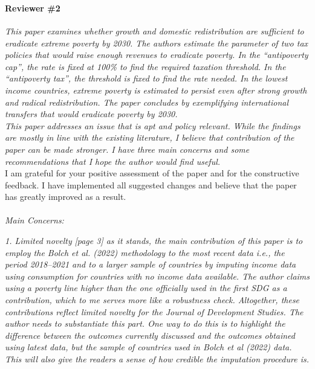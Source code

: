 \documentclass[12pt,english]{article}
\begin{document}
~\\ ~\\


\paragraph*{Reviewer \#2}

\textit{This paper examines whether growth and domestic redistribution are sufficient to eradicate extreme poverty by 2030. The authors estimate the parameter of two tax policies that would raise enough revenues to eradicate poverty. In the “antipoverty cap”, the rate is fixed at 100\% to find the required taxation threshold. In the “antipoverty tax”, the threshold is fixed to find the rate needed. In the lowest income countries, extreme poverty is estimated to persist even after strong growth and radical redistribution. The paper concludes by exemplifying international transfers that would eradicate poverty by 2030. }~\\

\textit{This paper addresses an issue that is apt and policy relevant. While the findings are mostly in line with the existing literature, I believe that contribution of the paper can be made stronger. I have three main concerns and some recommendations that I hope the author would find useful. }~\\

I am grateful for your positive assessment of the paper and for the constructive feedback. I have implemented all suggested changes and believe that the paper has greatly improved as a result.
~\\ ~\\
 
\textit{Main Concerns:}

\textit{1.	Limited novelty}
\textit{[page 3] as it stands, the main contribution of this paper is to employ the Bolch et al. (2022) methodology to the most recent data i.e., the period 2018–2021 and to a larger sample of countries by imputing income data using consumption for countries with no income data available. The author claims using a poverty line higher than the one officially used in the first SDG as a contribution, which to me serves more like a robustness check. Altogether, these contributions reflect limited novelty for the Journal of Development Studies. The author needs to substantiate this part. One way to do this is to highlight the difference between the outcomes currently discussed and the outcomes obtained using latest data, but the sample of countries used in Bolch et al (2022) data. This will also give the readers a sense of how credible the imputation procedure is.    }~\\
\end{document}
